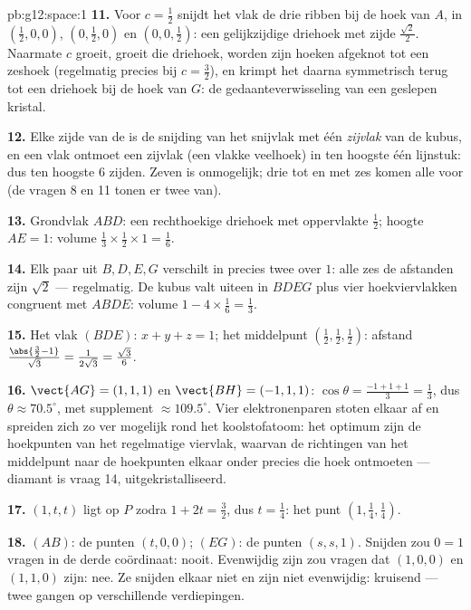 \begin{solution}{pb:g12:space:1}
\textbf{11.} Voor $c = \frac12$ snijdt het vlak de drie ribben bij de hoek van
$A$, in $\left(\frac12,0,0\right)$, $\left(0,\frac12,0\right)$ en
$\left(0,0,\frac12\right)$: een gelijkzijdige driehoek met zijde
$\frac{\sqrt2}{2}$. Naarmate $c$ groeit, groeit die driehoek, worden zijn
hoeken afgeknot tot een zeshoek (regelmatig precies bij $c = \frac32$), en
krimpt het  daarna symmetrisch terug tot een driehoek bij de hoek van
$G$: de gedaanteverwisseling van een geslepen kristal.

\textbf{12.} Elke zijde van de  is de snijding van het snijvlak met
één \emph{zijvlak} van de kubus, en een vlak ontmoet een zijvlak (een vlakke
veelhoek) in ten hoogste één lijnstuk: dus ten hoogste $6$ zijden. Zeven is
onmogelijk; drie tot en met zes komen alle voor (de vragen 8 en 11 tonen er
twee van).

\textbf{13.} Grondvlak $ABD$: een rechthoekige driehoek met oppervlakte
$\frac12$; hoogte $AE = 1$: volume
$\frac13 \times \frac12 \times 1 = \frac16$.

\textbf{14.} Elk paar uit $B, D, E, G$ verschilt in precies twee 
over $1$: alle zes de afstanden zijn $\sqrt2$ --- regelmatig. De kubus valt
uiteen in $BDEG$ plus vier hoekviervlakken congruent met $ABDE$: volume
$1 - 4 \times \frac16 = \frac13$.

\textbf{15.} Het vlak $(BDE)$: $x + y + z = 1$; het middelpunt
$\left(\frac12,\frac12,\frac12\right)$: afstand
$\frac{\abs{\frac32 - 1}}{\sqrt3} = \frac{1}{2\sqrt3} = \frac{\sqrt3}{6}$.

\textbf{16.} $\vect{AG} = (1,1,1)$ en $\vect{BH} = (-1,1,1)$:
$\cos\theta = \frac{-1 + 1 + 1}{3} = \frac13$, dus
$\theta \approx 70.5^\circ$, met supplement $\approx 109.5^\circ$. Vier
elektronenparen stoten elkaar af en spreiden zich zo ver mogelijk rond het
koolstofatoom: het optimum zijn de hoekpunten van het regelmatige viervlak,
waarvan de richtingen van het middelpunt naar de hoekpunten elkaar onder
precies die hoek ontmoeten --- diamant is vraag 14, uitgekristalliseerd.

\textbf{17.} $(1, t, t)$ ligt op $P$ zodra $1 + 2t = \frac32$, dus
$t = \frac14$: het punt $\left(1, \frac14, \frac14\right)$.

\textbf{18.} $(AB)$: de punten $(t, 0, 0)$; $(EG)$: de punten $(s, s, 1)$.
Snijden zou $0 = 1$ vragen in de derde coördinaat: nooit. Evenwijdig zijn zou
vragen dat $(1,0,0)$ en $(1,1,0)$  zijn: nee. Ze snijden elkaar
niet en zijn niet evenwijdig: kruisend --- twee gangen op verschillende
verdiepingen.


\end{solution}
